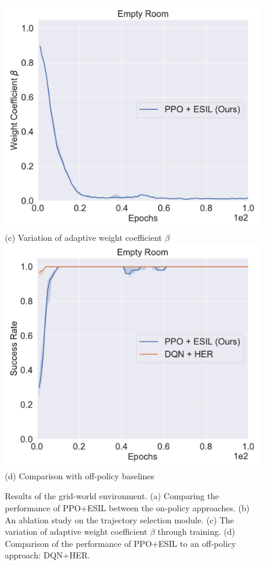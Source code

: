 \begin{figure}[H]
%
  \centering
  \includegraphics[width=\linewidth]{figures/chapter3/empty_room_samples.pdf}
  ({c}) Variation of adaptive weight coefficient $\beta$
\endminipage
{}%
  \centering
  \includegraphics[width=\linewidth]{figures/chapter3/empty_room_her.pdf}
  ({d}) Comparison with off-policy baselines
\endminipage\hfill
\caption{Results of the grid-world environment. ({a}) Comparing the performance of PPO+ESIL between the on-policy approaches. ({b}) An ablation study on the trajectory selection module. ({c}) The variation of adaptive weight coefficient $\beta$ through training. ({d}) Comparison of the performance of PPO+ESIL to an off-policy approach: DQN+HER.}
\label{fig:toy_results}
\end{figure}

